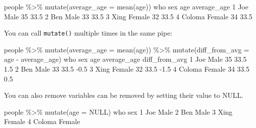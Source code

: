 \documentclass[
]{book}
\newenvironment{Shaded}{\begin{snugshade}}{\end{snugshade}}
\newcommand{\AttributeTok}[1]{\textcolor[rgb]{0.77,0.63,0.00}{#1}}
\newcommand{\ConstantTok}[1]{\textcolor[rgb]{0.00,0.00,0.00}{#1}}
\newcommand{\DecValTok}[1]{\textcolor[rgb]{0.00,0.00,0.81}{#1}}
\newcommand{\FloatTok}[1]{\textcolor[rgb]{0.00,0.00,0.81}{#1}}
\newcommand{\FunctionTok}[1]{\textcolor[rgb]{0.00,0.00,0.00}{#1}}
\newcommand{\NormalTok}[1]{#1}
\newcommand{\SpecialCharTok}[1]{\textcolor[rgb]{0.00,0.00,0.00}{#1}}
\begin{document}
\begin{Shaded}
\begin{Highlighting}[]
\NormalTok{people }\SpecialCharTok{\%\textgreater{}\%} \FunctionTok{mutate}\NormalTok{(}\AttributeTok{average\_age =} \FunctionTok{mean}\NormalTok{(age))}
\NormalTok{     who    sex age average\_age}
\DecValTok{1}\NormalTok{    Joe   Male  }\DecValTok{35}        \FloatTok{33.5}
\DecValTok{2}\NormalTok{    Ben   Male  }\DecValTok{33}        \FloatTok{33.5}
\DecValTok{3}\NormalTok{   Xing Female  }\DecValTok{32}        \FloatTok{33.5}
\DecValTok{4}\NormalTok{ Coloma Female  }\DecValTok{34}        \FloatTok{33.5}
\end{Highlighting}
\end{Shaded}

You can call \texttt{mutate()} multiple times in the same pipe:

\begin{Shaded}
\begin{Highlighting}[]
\NormalTok{people }\SpecialCharTok{\%\textgreater{}\%} \FunctionTok{mutate}\NormalTok{(}\AttributeTok{average\_age =} \FunctionTok{mean}\NormalTok{(age)) }\SpecialCharTok{\%\textgreater{}\%}
  \FunctionTok{mutate}\NormalTok{(}\AttributeTok{diff\_from\_avg =}\NormalTok{ age }\SpecialCharTok{{-}}\NormalTok{ average\_age)}
\NormalTok{     who    sex age average\_age diff\_from\_avg}
\DecValTok{1}\NormalTok{    Joe   Male  }\DecValTok{35}        \FloatTok{33.5}           \FloatTok{1.5}
\DecValTok{2}\NormalTok{    Ben   Male  }\DecValTok{33}        \FloatTok{33.5}          \SpecialCharTok{{-}}\FloatTok{0.5}
\DecValTok{3}\NormalTok{   Xing Female  }\DecValTok{32}        \FloatTok{33.5}          \SpecialCharTok{{-}}\FloatTok{1.5}
\DecValTok{4}\NormalTok{ Coloma Female  }\DecValTok{34}        \FloatTok{33.5}           \FloatTok{0.5}
\end{Highlighting}
\end{Shaded}

You can also remove variables can be removed by setting their value to NULL.

\begin{Shaded}
\begin{Highlighting}[]
\NormalTok{people }\SpecialCharTok{\%\textgreater{}\%} \FunctionTok{mutate}\NormalTok{(}\AttributeTok{age =} \ConstantTok{NULL}\NormalTok{)}
\NormalTok{     who    sex}
\DecValTok{1}\NormalTok{    Joe   Male}
\DecValTok{2}\NormalTok{    Ben   Male}
\DecValTok{3}\NormalTok{   Xing Female}
\DecValTok{4}\NormalTok{ Coloma Female}
\end{Highlighting}
\end{Shaded}
\end{document}
